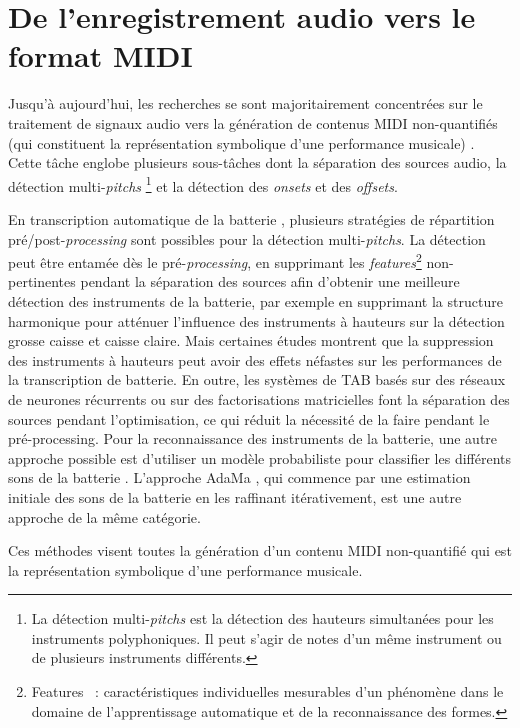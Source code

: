 \section{De l’enregistrement audio vers le format MIDI}
\label{audio_to_midi}
Jusqu’à aujourd’hui, les recherches se sont majoritairement concentrées sur le
traitement de signaux audio vers la génération de contenus MIDI non-quantifiés
(qui constituent la représentation symbolique d’une performance musicale)
\cite{AMT_for_2_Instru}. Cette tâche englobe plusieurs sous-tâches dont
la séparation des sources audio, la détection multi-\textit{pitchs} \footnote{
    La détection multi-\textit{pitchs} est la
détection des hauteurs simultanées pour les instruments polyphoniques. Il peut
s’agir de notes d’un même instrument ou de plusieurs instruments différents.}
et la détection des \textit{onsets} et des \textit{offsets}.

En transcription automatique de la batterie \cite{Review_ADT}, plusieurs
stratégies de répartition pré/post-\textit{processing} sont possibles pour la
détection multi-\textit{pitchs}. La détection peut être entamée dès le
pré-\textit{processing}, en supprimant les \textit{features}\footnote{
Features~ : caractéristiques individuelles mesurables d’un phénomène dans le
domaine de l’apprentissage automatique et de la reconnaissance des formes.}
non-pertinentes pendant la séparation des sources afin d’obtenir une meilleure
détection des instruments de la batterie, par exemple en supprimant la
structure harmonique pour atténuer l’influence des instruments à hauteurs sur
la détection grosse caisse et caisse claire. Mais certaines études montrent que
la suppression des instruments à hauteurs peut avoir des effets néfastes sur
les performances de la transcription de batterie. En outre, les systèmes de TAB
basés sur des réseaux de neurones récurrents ou sur des factorisations
matricielles font la séparation des sources pendant l’optimisation, ce qui
réduit la nécessité de la faire pendant le pré-processing. Pour la
reconnaissance des instruments de la batterie, une autre approche possible est
d’utiliser un modèle probabiliste pour classifier les différents sons de la
batterie \cite{Eronen}. L’approche AdaMa \cite{adama_1}, qui commence par une
estimation initiale des sons de la batterie en les raffinant itérativement, est
une autre approche de la même catégorie.

Ces méthodes visent toutes la génération d’un contenu MIDI non-quantifié qui
est la représentation symbolique d’une performance musicale.

